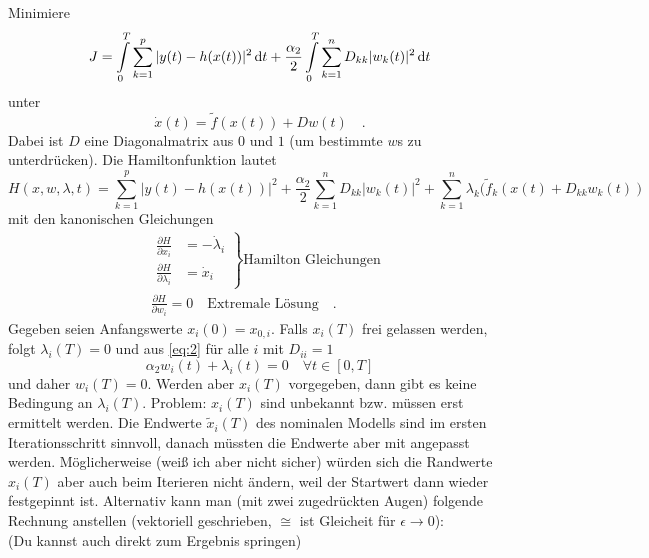 





Minimiere 
\begin{equation}
J = \int\limits_0^T \sum\limits_{k=1}^p |y(t) - h(x(t))|^2 \, \text{d} t + \frac{\alpha_2}{2}
\int\limits_0^T \sum\limits_{k=1}^n D_{kk} |w_k(t)|^2 \, \text{d} t
\end{equation}
unter
\begin{equation}
\dot{x}(t) = \tilde{f}(x(t)) + D w(t) \quad .
\end{equation}
Dabei ist $D$ eine Diagonalmatrix aus $0$ und $1$ (um bestimmte $w$s zu unterdrücken).
Die Hamiltonfunktion lautet
\begin{equation}
H(x,w,\lambda,t) = \sum\limits_{k=1}^p |y(t) - h(x(t))|^2 + \frac{\alpha_2}{2}\sum\limits_{k=1}^n D_{kk} |w_k(t)|^2 + \sum\limits_{k=1}^n \lambda_k (\tilde{f}_k(x(t) + D_{kk} w_k(t))
\end{equation}
mit den kanonischen Gleichungen
\begin{align}
&\left. 
\begin{aligned}
\frac{\partial H}{\partial x_i} &= -\dot{\lambda}_i \\
\frac{\partial H}{\partial \lambda_i} &= \dot{x}_i 
\end{aligned}
\right\}
\text{Hamilton Gleichungen} \\
&\frac{\partial H}{\partial w_i} = 0 \quad \text{Extremale Lösung}  \quad .
\label{eq:2}
\end{align}
Gegeben seien Anfangswerte $x_i(0)=x_{0,i}$.
Falls $x_i(T)$ frei gelassen werden, folgt $\lambda_i(T)=0$ und aus \eqref{eq:2} für alle 
$i$ mit $D_{ii}= 1$
\begin{equation}
\alpha_2 w_i(t) + \lambda_i(t) = 0 \quad \forall t\in[0,T]
\end{equation}
und daher $w_i(T)=0$.
Werden aber $x_i(T)$ vorgegeben, dann gibt es keine Bedingung an $\lambda_i(T)$. Problem: 
$x_i(T)$ sind unbekannt bzw. müssen erst ermittelt werden. Die Endwerte $\tilde{x}_i(T)$ 
des nominalen Modells sind im ersten Iterationsschritt sinnvoll, danach müssten die 
Endwerte aber mit angepasst werden. Möglicherweise (weiß ich aber nicht sicher) würden 
sich die Randwerte $x_i(T)$ aber auch beim Iterieren nicht ändern, weil der Startwert 
dann wieder festgepinnt ist. Alternativ kann man (mit zwei zugedrückten Augen) folgende 
Rechnung anstellen (vektoriell geschrieben, $\cong$ ist Gleicheit für $\epsilon\to0$):\\
(Du kannst auch direkt zum Ergebnis springen)\\


